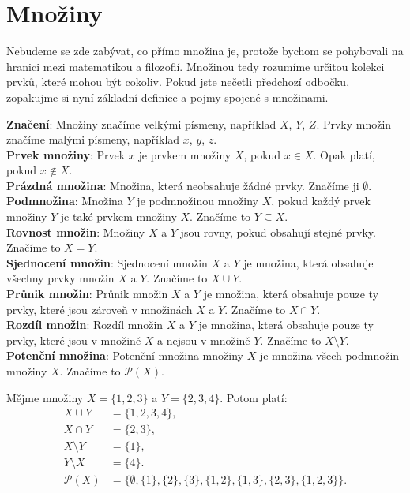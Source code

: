 \section{Množiny}
Nebudeme se zde zabývat, co přímo množina je, protože bychom se pohybovali na hranici mezi matematikou a filozofií. Množinou tedy rozumíme určitou kolekci prvků, které mohou být cokoliv. Pokud jste nečetli předchozí odbočku, zopakujme si nyní základní definice a pojmy spojené s množinami.
\begin{definitionbox}
  \textbf{Značení}: Množiny značíme velkými písmeny, například $X$, $Y$, $Z$. Prvky množin značíme malými písmeny, například $x$, $y$, $z$.\\
  \textbf{Prvek množiny}: Prvek $x$ je prvkem množiny $X$, pokud $x\in X$. Opak platí, pokud $x\notin X$.\\
  \textbf{Prázdná množina}: Množina, která neobsahuje žádné prvky. Značíme ji $\emptyset$. \\
  \textbf{Podmnožina}: Množina $Y$ je podmnožinou množiny $X$, pokud každý prvek množiny $Y$ je také prvkem množiny $X$. Značíme to $Y\subseteq X$. \\
  \textbf{Rovnost množin}: Množiny $X$ a $Y$ jsou rovny, pokud obsahují stejné prvky. Značíme to $X = Y$. \\
  \textbf{Sjednocení množin}: Sjednocení množin $X$ a $Y$ je množina, která obsahuje všechny prvky množin $X$ a $Y$. Značíme to $X\cup Y$. \\
  \textbf{Průnik množin}: Průnik množin $X$ a $Y$ je množina, která obsahuje pouze ty prvky, které jsou zároveň v množinách $X$ a $Y$. Značíme to $X\cap Y$. \\
  \textbf{Rozdíl množin}: Rozdíl množin $X$ a $Y$ je množina, která obsahuje pouze ty prvky, které jsou v množině $X$ a nejsou v množině $Y$. Značíme to $X\setminus Y$. \\
  \textbf{Potenční množina}: Potenční množina množiny $X$ je množina všech podmnožin množiny $X$. Značíme to $\mathcal{P}(X)$. \\
\end{definitionbox}


\begin{example}
  Mějme množiny $X = \{1, 2, 3\}$ a $Y = \{2, 3, 4\}$. Potom platí:
  \begin{align*}
    X\cup Y &= \{1, 2, 3, 4\},\\
    X\cap Y &= \{2, 3\},\\
    X\setminus Y &= \{1\},\\
    Y\setminus X &= \{4\}. \\
    \mathcal{P}(X) &= \{\emptyset, \{1\}, \{2\}, \{3\}, \{1, 2\}, \{1, 3\}, \{2, 3\}, \{1, 2, 3\}\}.
  \end{align*}
\end{example}

